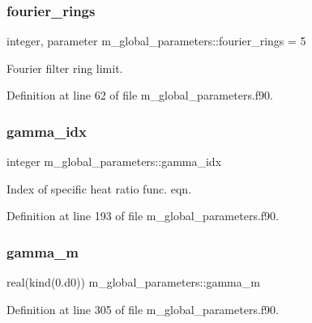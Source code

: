 \subsubsection{\texorpdfstring{fourier\+\_\+rings}{fourier\_rings}}
{\footnotesize\ttfamily integer, parameter m\+\_\+global\+\_\+parameters\+::fourier\+\_\+rings = 5}



Fourier filter ring limit. 



Definition at line 62 of file m\+\_\+global\+\_\+parameters.\+f90.

\mbox{\label{namespacem__global__parameters_a4ecdedaf3db880f8d71dbefc816322f8}} 
\subsubsection{\texorpdfstring{gamma\+\_\+idx}{gamma\_idx}}
{\footnotesize\ttfamily integer m\+\_\+global\+\_\+parameters\+::gamma\+\_\+idx}



Index of specific heat ratio func. eqn. 



Definition at line 193 of file m\+\_\+global\+\_\+parameters.\+f90.

\mbox{\label{namespacem__global__parameters_adfa6a4a17c338d84a6d6ad5a0b9412de}} 
\subsubsection{\texorpdfstring{gamma\+\_\+m}{gamma\_m}}
{\footnotesize\ttfamily real(kind(0.d0)) m\+\_\+global\+\_\+parameters\+::gamma\+\_\+m}



Definition at line 305 of file m\+\_\+global\+\_\+parameters.\+f90.

\mbox{\label{namespacem__global__parameters_ad507a6f681cefe17e49f283d47a7c0ad}} 
